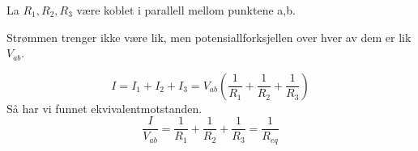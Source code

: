 La $R_1, R_2, R_3$ være koblet i parallell mellom punktene a,b.

Strømmen trenger ikke være lik, men
potensiallforksjellen over hver av dem er lik $V_{ab}$.

$$I = I_1 + I_2 + I_3
    = V_{ab} \left( \frac{1}{R_1} + \frac{1}{R_2} + \frac{1}{R_3} \right)$$
Så har vi funnet ekvivalentmotstanden.
$$\frac{I}{V_{ab}} = \frac{1}{R_1} + \frac{1}{R_2} + \frac{1}{R_3}
                   = \frac{1}{R_{eq}}$$
